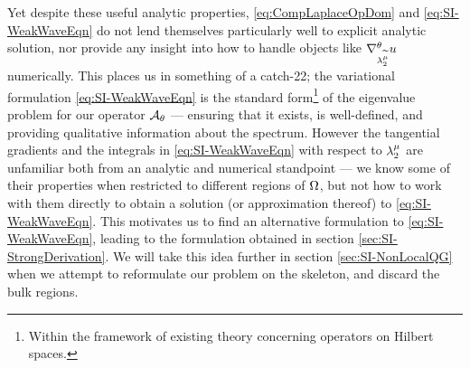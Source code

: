 Yet despite these useful analytic properties, \eqref{eq:CompLaplaceOpDom} and \eqref{eq:SI-WeakWaveEqn} do not lend themselves particularly well to explicit analytic solution, nor provide any insight into how to handle objects like $\nabla^{\theta}_{\lambda_2^{\widetilde{\mu}}}u$ numerically.
This places us in something of a catch-22; the variational formulation \eqref{eq:SI-WeakWaveEqn} is the standard form\footnote{Within the framework of existing theory concerning operators on Hilbert spaces.} of the eigenvalue problem for our operator $\mathcal{A}_{\theta}$ --- ensuring that it exists, is well-defined, and providing qualitative information about the spectrum.
However the tangential gradients and the integrals in \eqref{eq:SI-WeakWaveEqn} with respect to $\lambda_2^{\mu}$ are unfamiliar both from an analytic and numerical standpoint --- we know some of their properties when restricted to different regions of $\Omega$, but not how to work with them directly to obtain a solution (or approximation thereof) to \eqref{eq:SI-WeakWaveEqn}.
This motivates us to find an alternative formulation to \eqref{eq:SI-WeakWaveEqn}, leading to the formulation obtained in section \ref{sec:SI-StrongDerivation}.
We will take this idea further in section \ref{sec:SI-NonLocalQG} when we attempt to reformulate our problem on the skeleton, and discard the bulk regions.

